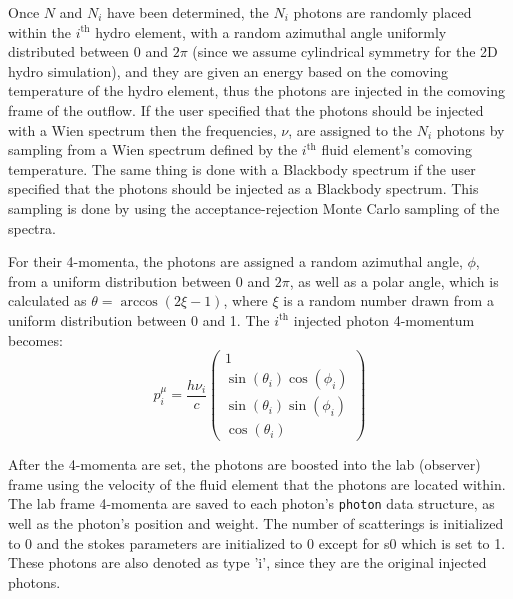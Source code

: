 \documentclass[12pt,a4paper]{article}
\begin{document}
Once $N$ and $N_i$ have been determined, the $N_i$ photons are randomly placed within the $i^\mathrm{th}$ hydro element, with a random azimuthal angle uniformly distributed between $0$ and $2\pi$ (since we assume cylindrical symmetry for the 2D hydro simulation), and they are given an energy based on the comoving temperature of the hydro element, thus the photons are injected in the comoving frame of the outflow. If the user specified that the photons should be injected with a Wien spectrum then the frequencies, $\nu$, are assigned to the $N_i$ photons by sampling from a Wien spectrum defined by the $i^\mathrm{th}$ fluid element's comoving temperature. The same thing is done with a Blackbody spectrum if the user specified that the photons should be injected as a Blackbody spectrum. This sampling is done by using the acceptance-rejection Monte Carlo sampling of the spectra.

For their 4-momenta, the photons are assigned a random azimuthal angle, $\phi$, from a uniform distribution between $0$ and $2\pi$, as well as a polar angle, which is calculated as $\theta=\arccos(2\xi-1)$, where $\xi$ is a random number drawn from a uniform distribution between 0 and 1. The $i^\mathrm{th}$ injected photon 4-momentum becomes:
\[
p^\mu_i=\frac{h\nu_i}{c}\begin{pmatrix}
1 \\ \sin(\theta_i) \cos(\phi_i) \\ \sin(\theta_i) \sin(\phi_i) \\ \cos(\theta_i)
\end{pmatrix}
\]

After the 4-momenta are set, the photons are boosted into the lab (observer) frame using the velocity of the fluid element that the photons are located within. The lab frame 4-momenta are saved to each photon's \texttt{photon} data structure, as well as the photon's position and weight. The number of scatterings is initialized to 0 and the stokes parameters are initialized to 0 except for s0 which is set to 1. These photons are also denoted as type 'i', since they are the original injected photons.
\end{document}
